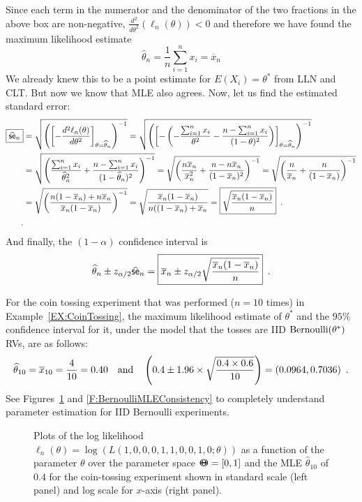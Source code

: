 \begin{example}
Since each term in the numerator and the denominator of the two fractions in the above box are non-negative, $\frac{d^2}{d \theta^2} (\ell_n(\theta))< 0$ and therefore we have found the maximum likelihood estimate
\[
\widehat{\theta}_n  = \frac{1}{n} \sum_{i=1}^n x_i = \overline{x}_n
\]
We already knew this to be a point estimate for $E(X_i)=\theta^*$ from LLN and CLT.  But now we know that MLE also agrees.
Now, let us find the estimated standard error:
\begin{align*}
\boxed{\widehat{\mathsf{se}}_n} 
&= \sqrt{\left( \left[ -\frac{d^2 \ell_n(\theta)}{d \theta^2}\right]_{\theta=\widehat{\theta}_n}\right)^{-1}} 
= \sqrt{\left( \left[ - \left( -\frac{{\sum_{i=1}^n x_i}}{\theta^2} - \frac{n-{\sum_{i=1}^n x_i}}{(1-\theta)^2}\right) \right]_{\theta=\widehat{\theta}_n}\right)^{-1}} \\
&= \sqrt{\left( \frac{{\sum_{i=1}^n x_i}}{\widehat{\theta}_n^2} + \frac{n-{\sum_{i=1}^n x_i}}{(1-\widehat{\theta}_n)^2} \right)^{-1}}
= \sqrt{\left( \frac{n\overline{x}_n}{\overline{x}_n^2} + \frac{n-n\overline{x}_n}{(1-\overline{x}_n)^2} \right)^{-1}}
= \sqrt{\left( \frac{n}{\overline{x}_n} + \frac{n}{(1-\overline{x}_n)} \right)^{-1}}\\
&= \sqrt{\left( \frac{n(1-\overline{x}_n)+n\overline{x}_n}{\overline{x}_n(1-\overline{x}_n)} \right)^{-1}}
= \sqrt{\frac{\overline{x}_n(1-\overline{x}_n)}{n((1-\overline{x}_n)+\overline{x}_n}}
= \boxed{\sqrt{\frac{\overline{x}_n(1-\overline{x}_n)}{n}}} \enspace .\\
\enspace .
\end{align*}
And finally, the $(1-\alpha)$ confidence interval is
\[
\widehat{\theta}_n \pm z_{\alpha/2} \widehat{\mathsf{se}}_n 
= \boxed{\overline{x}_n \pm z_{\alpha/2} \sqrt{\frac{\overline{x}_n(1-\overline{x}_n)}{n}}} \enspace . 
\]

For the coin tossing experiment that was performed ($n=10$ times) in Example~\ref{EX:CoinTossing}, the maximum likelihood estimate of $\theta^*$ and the $95\%$ confidence interval for it, under the model that the tosses are IID $\mbox{{\rm Bernoulli}}(\theta^*)$ RVs, are as follows:
\[
\widehat{\theta}_{10} 
= \overline{x}_{10} =\frac{4}{10}=0.40
\quad \text{and} \quad \left(0.4 \pm 1.96 \times \sqrt{\frac{0.4 \times 0.6}{10}}\right) =  (0.0964, 0.7036) \enspace .
\]
See Figures~\ref{F:BernoulliMLE} and \ref{F:BernoulliMLEConsistency} to completely understand parameter estimation for IID Bernoulli experiments.
\end{example}

\begin{figure}[htpb]
\caption{Plots of the log likelihood $\ell_n(\theta)=\log(L(1,0,0,0,1,1,0,0,1,0;\theta))$ as a function of the parameter $\theta$ over the parameter space ${\Theta}\mspace{-11 mu}{\Theta}=[0,1]$ and the MLE $\widehat{\theta}_{10}$ of $0.4$ for the coin-tossing experiment shown in standard scale (left panel) and log scale for $x$-axis (right panel).\label{F:BernoulliMLE}}
\centering   {}
\end{figure}


